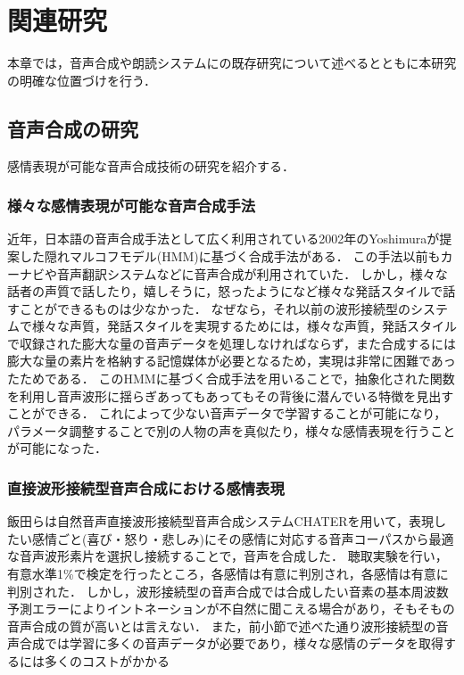 \chapter{関連研究}

本章では，音声合成や朗読システムにの既存研究について述べるとともに本研究の明確な位置づけを行う．

\section{音声合成の研究}\label{research:speech_synthesis}
感情表現が可能な音声合成技術の研究を紹介する．

\subsection{様々な感情表現が可能な音声合成手法}
近年，日本語の音声合成手法として広く利用されている2002年のYoshimura\cite{yoshimura}が提案した隠れマルコフモデル(HMM)に基づく合成手法がある．
この手法以前もカーナビや音声翻訳システムなどに音声合成が利用されていた．
しかし，様々な話者の声質で話したり，嬉しそうに，怒ったようになど様々な発話スタイルで話すことができるものは少なかった．
なぜなら，それ以前の波形接続型のシステムで様々な声質，発話スタイルを実現するためには，様々な声質，発話スタイルで収録された膨大な量の音声データを処理しなければならず，また合成するには膨大な量の素片を格納する記憶媒体が必要となるため，実現は非常に困難であったためである．
このHMMに基づく合成手法を用いることで，抽象化された関数を利用し音声波形に揺らぎあってもあってもその背後に潜んでいる特徴を見出すことができる．
これによって少ない音声データで学習することが可能になり，パラメータ調整することで別の人物の声を真似たり，様々な感情表現を行うことが可能になった．

\subsection{直接波形接続型音声合成における感情表現}
飯田ら\cite{iida}は自然音声直接波形接続型音声合成システムCHATERを用いて，表現したい感情ごと(喜び・怒り・悲しみ)にその感情に対応する音声コーパスから最適な音声波形素片を選択し接続することで，音声を合成した．
聴取実験を行い，有意水準1\%で検定を行ったところ，各感情は有意に判別され，各感情は有意に判別された．
しかし，波形接続型の音声合成では合成したい音素の基本周波数予測エラーによりイントネーションが不自然に聞こえる場合があり，そもそもの音声合成の質が高いとは言えない．
また，前小節で述べた通り波形接続型の音声合成では学習に多くの音声データが必要であり，様々な感情のデータを取得するには多くのコストがかかる

